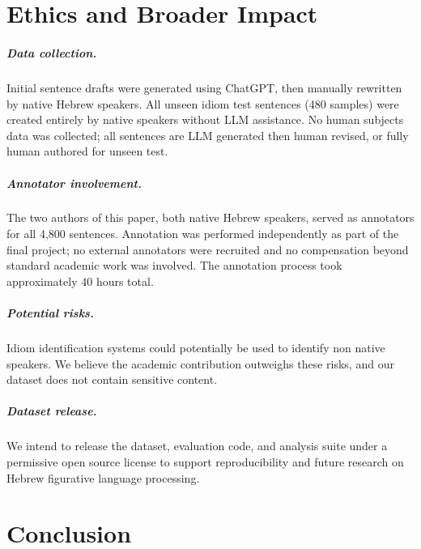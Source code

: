 \documentclass[11pt, a4paper]{report}
\begin{document}

\chapter{Ethics and Broader Impact}

\paragraph{Data collection.}
Initial sentence drafts were generated using ChatGPT, then manually rewritten by native Hebrew speakers. All unseen idiom test sentences (480 samples) were created entirely by native speakers without LLM assistance. No human subjects data was collected; all sentences are LLM generated then human revised, or fully human authored for unseen test.

\paragraph{Annotator involvement.}
The two authors of this paper, both native Hebrew speakers, served as annotators for all 4,800 sentences. Annotation was performed independently as part of the final project; no external annotators were recruited and no compensation beyond standard academic work was involved. The annotation process took approximately 40 hours total.

\paragraph{Potential risks.}
Idiom identification systems could potentially be used to identify non native speakers. We believe the academic contribution outweighs these risks, and our dataset does not contain sensitive content.

\paragraph{Dataset release.}
We intend to release the dataset, evaluation code, and analysis suite under a permissive open source license to support reproducibility and future research on Hebrew figurative language processing.


\chapter{Conclusion}
\end{document}
